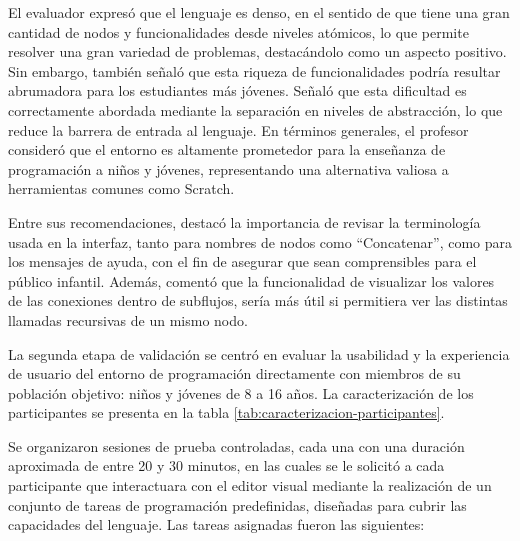 El evaluador expresó que el lenguaje es denso, en el sentido de que tiene una gran cantidad de nodos y funcionalidades desde niveles atómicos, lo que permite resolver una gran variedad de problemas, destacándolo como un aspecto positivo. Sin embargo, también señaló que esta riqueza de funcionalidades podría resultar abrumadora para los estudiantes más jóvenes. Señaló que esta dificultad es correctamente abordada mediante la separación en niveles de abstracción, lo que reduce la barrera de entrada al lenguaje. En términos generales, el profesor consideró que el entorno es altamente prometedor para la enseñanza de programación a niños y jóvenes, representando una alternativa valiosa a herramientas comunes como Scratch.

Entre sus recomendaciones, destacó la importancia de revisar la terminología usada en la interfaz, tanto para nombres de nodos como ``Concatenar'', como para los mensajes de ayuda, con el fin de asegurar que sean comprensibles para el público infantil. Además, comentó que la funcionalidad de visualizar los valores de las conexiones dentro de subflujos, sería más útil si permitiera ver las distintas llamadas recursivas de un mismo nodo.


La segunda etapa de validación se centró en evaluar la usabilidad y la experiencia de usuario del entorno de programación directamente con miembros de su población objetivo: niños y jóvenes de 8 a 16 años. La caracterización de los participantes se presenta en la tabla \ref{tab:caracterizacion-participantes}.

Se organizaron sesiones de prueba controladas, cada una con una duración aproximada de entre 20 y 30 minutos, en las cuales se le solicitó a cada participante que interactuara con el editor visual mediante la realización de un conjunto de tareas de programación predefinidas, diseñadas para cubrir las capacidades del lenguaje. Las tareas asignadas fueron las siguientes:

